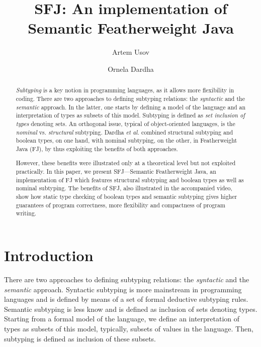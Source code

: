 \documentclass[runningheads]{llncs}
\begin{document}
\title{SFJ: An implementation of Semantic Featherweight Java
}

\author{Artem Usov \and Ornela Dardha}


\maketitle

\begin{abstract}
\emph{Subtyping} is a key notion in programming languages, as it allows more flexibility in coding.
There are two approaches to defining subtyping relations: the \emph{syntactic} and the \emph{semantic} approach.
In the latter, one starts by defining a model of the language and an interpretation of types as subsets of this model.
Subtyping is defined as \emph{set inclusion of types} denoting sets.
An orthogonal issue, typical of object-oriented languages, is the \emph{nominal} vs. \emph{structural} subtyping.
Dardha \emph{et al.} \cite{Dardha2013,Dardha2017} combined structural subtyping and boolean types, on one hand, with nominal subtyping, on the other, in Featherweight Java (FJ), by thus exploiting the benefits of both approaches.

However, these benefits were illustrated only at a theoretical level but not exploited practically.
In this paper, we present SFJ---Semantic Featherweight Java, an implementation of FJ which features structural subtyping and boolean types as well as nominal subtyping.
The benefits of SFJ, also illustrated in the accompanied video, show how static type checking of boolean types and semantic subtyping gives higher guarantees of program correctness, more flexibility and compactness of program writing.
\end{abstract}


\section{Introduction}
There are two approaches to defining subtyping relations: the \emph{syntactic} and the \emph{semantic} approach.
Syntactic subtyping is more mainstream in programming languages and is defined by means of a set of formal deductive subtyping rules.
Semantic subtyping is less know and is defined as inclusion of sets denoting types. Starting from a formal model of the  language, we define an interpretation of types as subsets of this model, typically, subsets of values in the language. Then, subtyping is defined as inclusion of these subsets.
\end{document}
